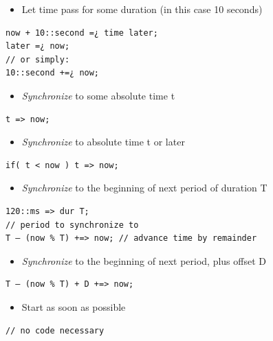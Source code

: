 \begin{itemize}
	\item Let time pass for some duration (in this case 10 seconds)
\end{itemize}

\begin{verbatim}
now + 10::second =¿ time later;
later =¿ now;
// or simply:
10::second +=¿ now;
\end{verbatim}


\begin{itemize}
	\item \textit{Synchronize} to some absolute time t
\end{itemize}

\begin{verbatim}
t => now;
\end{verbatim}


\begin{itemize}
	\item \textit{Synchronize} to absolute time t or later
\end{itemize}

\begin{verbatim}
if( t < now ) t => now;
\end{verbatim}


\begin{itemize}
	\item \textit{Synchronize} to the beginning of next period of duration T
\end{itemize}

\begin{verbatim}
120::ms => dur T;
// period to synchronize to
T – (now % T) +=> now; // advance time by remainder
\end{verbatim}


\begin{itemize}
	\item \textit{Synchronize} to the beginning of next period, plus offset D
\end{itemize}

\begin{verbatim}
T – (now % T) + D +=> now;
\end{verbatim}


\begin{itemize}
	\item Start as soon as possible
\end{itemize}

\begin{verbatim}
// no code necessary
\end{verbatim}


